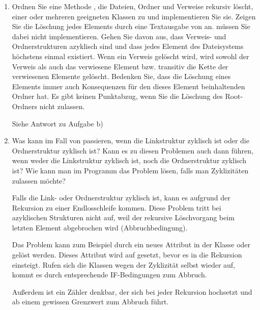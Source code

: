 \documentclass{bschlangaul-aufgabe}
\begin{document}
\begin{enumerate}

\item Ordnen Sie eine Methode , die Dateien, Ordner
und Verweise rekursiv löscht, einer oder mehreren geeigneten Klassen zu
und implementieren Sie sie. Zeigen Sie die Löschung jedes Elements durch
eine Textausgabe von  an. 
müssen Sie dabei nicht implementieren. Gehen Sie davon aus, dass
Verweis- und Ordnerstrukturen azyklisch sind und dass jedes Element des
Dateisystems höchstens einmal existiert. Wenn ein Verweis gelöscht wird,
wird sowohl der Verweis als auch das verwiesene Element bzw. transitiv
die Kette der verwiesenen Elemente gelöscht. Bedenken Sie, dass die
Löschung eines Elements immer auch Konsequenzen für den dieses Element
beinhaltenden Ordner hat. Es gibt keinen Punktabzug, wenn Sie die
Löschung des Root-Ordners nicht zulassen.

\begin{bAntwort}
Siehe Antwort zu Aufgabe b)
\end{bAntwort}


\item Was kann im Fall von  passieren,
wenn die Linkstruktur zyklisch ist oder die Ordnerstruktur zyklisch ist?
Kann es zu diesen Problemen auch dann führen, wenn weder die
Linkstruktur zyklisch ist, noch die Ordnerstruktur zyklisch ist? Wie
kann man im Programm das Problem lösen, falls man Zyklizitäten zulassen
möchte?

\begin{bAntwort}
Falls die Link- oder Ordnerstruktur zyklisch ist, kann es aufgrund der
Rekursion zu einer Endlosschleife kommen. Diese Problem tritt bei
azyklischen Strukturen nicht auf, weil der rekursive Löschvorgang beim
letzten Element abgebrochen wird (Abbruchbedingung).

Das Problem kann zum Beispiel durch ein neues Attribut
 in der Klasse  oder
 gelöst werden. Dieses Attribut wird auf
 gesetzt, bevor es in die Rekursion einsteigt. Rufen
sich die Klassen wegen der Zyklizität selbst wieder auf, kommt es durch
entsprechende IF-Bedingungen zum Abbruch.

Außerdem ist ein Zähler denkbar, der sich bei jeder Rekursion hochsetzt
und ab einem gewissen Grenzwert zum Abbruch führt.
\end{bAntwort}



\end{enumerate}
\end{document}
